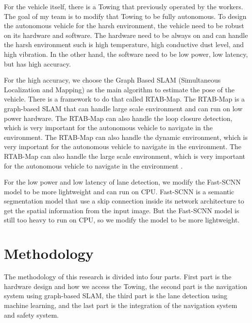 \documentclass[conference]{IEEEtran}
\begin{document}
\par    
For the vehicle itself, there is a Towing that previously operated by the workers. The goal of my team is to modify that Towing to be fully autonomous. To design the autonomous vehicle for the harsh environment, the vehicle need to be robust on its hardware and software. The hardware need to be always on and can handle the harsh environment such is high temperature, high conductive dust level, and high vibration. In the other hand, the software need to be low power, low latency, but has high accuracy.

\par    
For the high accuracy, we choose the Graph Based SLAM (Simultaneous Localization and Mapping) as the main algorithm to estimate the pose of the vehicle. There is a framework to do that called RTAB-Map. The RTAB-Map is a graph-based SLAM that can handle large scale environment and can run on low power hardware. The RTAB-Map can also handle the loop closure detection, which is very important for the autonomous vehicle to navigate in the environment. The RTAB-Map can also handle the dynamic environment, which is very important for the autonomous vehicle to navigate in the environment. The RTAB-Map can also handle the large scale environment, which is very important for the autonomous vehicle to navigate in the environment \cite{ref_rtabmap}.  

\par    
For the low power and low latency of lane detection, we modify the Fast-SCNN model \cite{ref_fast_scnn} to be more lightweight and can run on CPU. Fast-SCNN is a semantic segmentation model that use a skip connection inside its network architecture to get the spatial information from the input image. But the Fast-SCNN model is still too heavy to run on CPU, so we modify the model to be more lightweight.  


\section{Methodology}
The methodology of this research is divided into four parts. First part is the hardware design and how we access the Towing, the second part is the navigation system using graph-based SLAM, the third part is the lane detection using machine learning, and the last part is the integration of the navigation system and safety system. 
\end{document}
